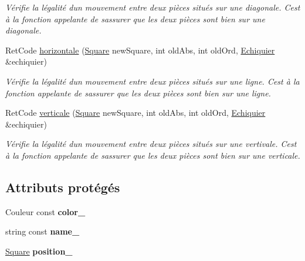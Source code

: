 \begin{DoxyCompactItemize}
\begin{DoxyCompactList}\small\item\em Vérifie la légalité d\textquotesingle{}un mouvement entre deux pièces situés sur une diagonale. C\textquotesingle{}est à la fonction appelante de s\textquotesingle{}assurer que les deux pièces sont bien sur une diagonale. \end{DoxyCompactList}\item 
Ret\+Code \hyperlink{classPiece_a5f13c0a4cc2694f4e14117d9b48a9ca4}{horizontale} (\hyperlink{classSquare}{Square} new\+Square, int old\+Abs, int old\+Ord, \hyperlink{classEchiquier}{Echiquier} \&echiquier)
\begin{DoxyCompactList}\small\item\em Vérifie la légalité d\textquotesingle{}un mouvement entre deux pièces situés sur une ligne. C\textquotesingle{}est à la fonction appelante de s\textquotesingle{}assurer que les deux pièces sont bien sur une ligne. \end{DoxyCompactList}\item 
Ret\+Code \hyperlink{classPiece_a34205209a19b563a9cb808a0c9eed3d1}{verticale} (\hyperlink{classSquare}{Square} new\+Square, int old\+Abs, int old\+Ord, \hyperlink{classEchiquier}{Echiquier} \&echiquier)
\begin{DoxyCompactList}\small\item\em Vérifie la légalité d\textquotesingle{}un mouvement entre deux pièces situés sur une vertivale. C\textquotesingle{}est à la fonction appelante de s\textquotesingle{}assurer que les deux pièces sont bien sur une verticale. \end{DoxyCompactList}\end{DoxyCompactItemize}
\subsection*{Attributs protégés}
\begin{DoxyCompactItemize}
\item 
\mbox{\label{classPiece_aa8a0e5930abd970ee64db7dd3d03bc6d}} 
Couleur const {\bfseries color\+\_\+}
\item 
\mbox{\label{classPiece_ada2240a0c823038fc73e37df8475ab72}} 
string const {\bfseries name\+\_\+}
\item 
\mbox{\label{classPiece_afb4c531962f6dc79903e831c165a3955}} 
\hyperlink{classSquare}{Square} {\bfseries position\+\_\+}
\end{DoxyCompactItemize}


